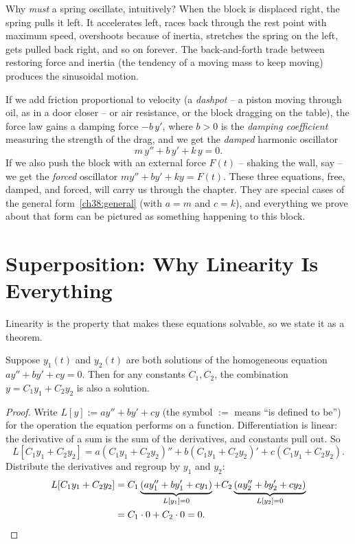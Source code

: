 \begin{intuitionbox}
Why \emph{must} a spring oscillate, intuitively? When the block is displaced
right, the spring pulls it left. It accelerates left, races back through the rest
point with maximum speed, overshoots because of inertia, stretches the spring on
the left, gets pulled back right, and so on forever. The back-and-forth trade
between restoring force and inertia (the tendency of a moving mass to keep
moving) produces the sinusoidal motion.
\end{intuitionbox}

If we add friction proportional to velocity (a \emph{dashpot} -- a piston moving
through oil, as in a door closer -- or air resistance, or the
block dragging on the table), the force law gains a damping force $-b\,y'$,
where $b > 0$ is the \emph{damping coefficient} measuring the strength of the
drag, and we get the \emph{damped} harmonic oscillator
\begin{equation}
  m\,y'' + b\,y' + k\,y = 0.
  \label{ch38:damped}
\end{equation}
If we also push the block with an external force $F(t)$ -- shaking the wall,
say -- we get the \emph{forced} oscillator $m y'' + b y' + k y = F(t)$. These
three equations, free, damped, and forced, will carry us through the
chapter. They are special cases of the general form~\eqref{ch38:general} (with
$a = m$ and $c = k$), and
everything we prove about that form can be pictured as something happening to
this block.

\section{Superposition: Why Linearity Is Everything}
\label{ch38:superposition}

Linearity is the property that makes
these equations solvable, so we state it as a theorem.

\begin{theorem}
\label{ch38:thm-superposition}
Suppose $y_1(t)$ and $y_2(t)$ are both solutions of the homogeneous equation
$a y'' + b y' + c y = 0$. Then for any constants $C_1, C_2$, the combination
$y = C_1 y_1 + C_2 y_2$ is also a solution.
\end{theorem}

\begin{proof}
Write $L[y] := a y'' + b y' + c y$ (the symbol $:=$ means ``is defined to be'')
for the operation the equation performs on a
function. Differentiation is linear: the derivative of a sum is the sum of the
derivatives, and constants pull out. So
\[
  L[C_1 y_1 + C_2 y_2]
  = a(C_1 y_1 + C_2 y_2)'' + b(C_1 y_1 + C_2 y_2)' + c(C_1 y_1 + C_2 y_2).
\]
Distribute the derivatives and regroup by $y_1$ and $y_2$:
\begin{align*}
  L[C_1 y_1 + C_2 y_2]
  &= C_1\underbrace{(a y_1'' + b y_1' + c y_1)}_{L[y_1] = 0}
  + C_2\underbrace{(a y_2'' + b y_2' + c y_2)}_{L[y_2] = 0} \\
  &= C_1\cdot 0 + C_2 \cdot 0 = 0. \qedhere
\end{align*}
\end{proof}

